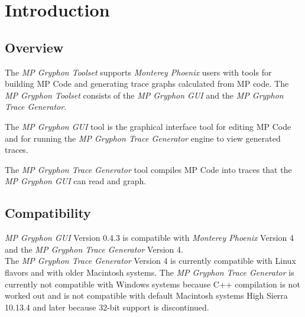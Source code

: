 \documentclass[11pt,fleqn]{article} %
\begin{document}
\newcommand \mpgt {\textit{MP Gryphon Toolset}\xspace}
\newcommand \ggui {\textit{MP Gryphon GUI}\xspace}
\newcommand \gtg {\textit{MP Gryphon Trace Generator}\xspace}
\newcommand \mphoenix {\textit{Monterey Phoenix}\xspace}





\setlength{\parindent}{0pt} %
\newpage
\thispagestyle{empty}
\mbox{}
\newpage

\tableofcontents
\newpage
{}
\newpage

\section{Introduction}
\label{intro}
\subsection {Overview}
The \mpgt supports \mphoenix users with tools for building MP Code and generating trace graphs calculated from MP code.
The \mpgt consists of the \ggui and the \gtg.\\
\begin{compactitem}
\item The \ggui tool is the graphical interface tool for editing MP Code and for running the \gtg engine to view generated traces.
\item The \gtg tool compiles MP Code into traces that the \ggui can read and graph.\\
\end{compactitem}

\subsection{Compatibility}
\ggui Version 0.4.3 is compatible with \mphoenix Version 4 and the \gtg Version 4.\\

The \gtg Version 4 is currently compatible with Linux flavors and with older Macintosh systems.  The \gtg is currently not compatible with Windows systems because C++ compilation is not worked out and is not compatible with default Macintosh systems High Sierra 10.13.4 and later because 32-bit support is discontinued.
\end{document}
